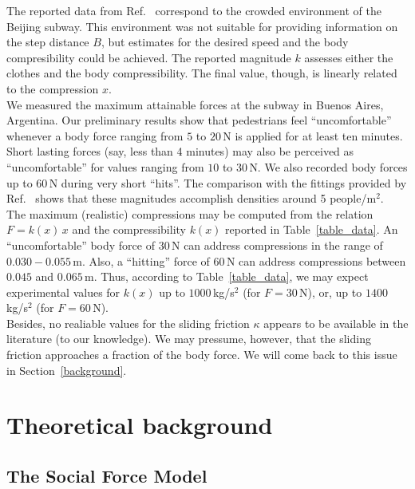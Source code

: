 \documentclass[preprint,12pt]{elsarticle}
\begin{document}
The reported data from Ref.~\cite{song_2019} correspond to the crowded 
environment of the Beijing subway. This environment was not suitable for 
providing information on the step distance $B$, but estimates for the 
desired speed and the body compresibility could be achieved. The reported 
magnitude $k$ assesses either the clothes and the body compressibility. The 
final value, though, is linearly related to the compression $x$. \\

We measured the maximum attainable forces at the subway in Buenos Aires, 
Argentina. Our preliminary results show that pedestrians feel ``uncomfortable'' 
whenever a body force ranging from $5$ to $20\,$N is applied for at least ten 
minutes. Short lasting forces (say, less than 4 minutes) may also be perceived 
as ``uncomfortable'' for values ranging from $10$ to $30\,$N. We also recorded body 
forces up to $60\,$N during very short ``hits''. The comparison with the 
fittings provided by Ref.~\cite{song_2019} shows that these magnitudes 
accomplish densities around 5 people/m$^2$.     \\    

The maximum (realistic) compressions may be computed from the relation 
$F=k(x)\,x$ and the compressibility $k(x)$ reported in Table~\ref{table_data}. 
An ``uncomfortable'' body force of $30\,$N can address compressions in the 
range of $0.030-0.055\,$m. Also, a ``hitting'' force of $60\,$N can address 
compressions between $0.045$ and $0.065\,$m. Thus, according to 
Table~\ref{table_data}, we may expect experimental values for $k(x)$ up to 
$1000\,$kg/s$^2$ (for $F=30\,$N), or, up to $1400\,$kg/s$^2$ (for $F=60\,$N). \\

Besides, no realiable values for the sliding friction $\kappa$ appears to be 
available in the literature (to our knowledge). We may pressume, however, that 
the sliding friction approaches a fraction of the body force. We will come back 
to this issue in Section~\ref{background}. \\


\section{\label{background}Theoretical background}

\subsection{\label{sfm}The Social Force Model}
\end{document}
